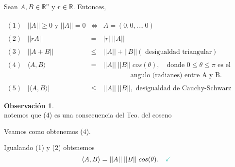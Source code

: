 \documentclass{article}
\theoremstyle{definition}
\theoremstyle{definition}
\newtheorem*{obs}{Observación}
\theoremstyle{remark}
\newcommand\ok{\checkmark}
\begin{document}
\begin{teo}
  Sean $A,B \in \mathbb{R}^n$ y $r \in \mathbb{R}$. Entonces,\\\\ $\begin{array}{llcl}
    (1) & ||A|| \geq 0 \text{ y } ||A||=0 & \Leftrightarrow & A=(0,0,\dots,0) \\ \\
    (2) & ||rA|| & = &  |r|\; ||A|| \\\\
    (3) & ||A+B|| & \leq & ||A|| + ||B|| (\text{ desigualdad triangular}) \\\\
  (4) & \langle A,B \rangle & = & ||A||\; ||B|| \; cos(\theta), \quad  \text{donde } 0 \leq \theta \leq \pi \text{ es el}\\ & & & \quad \quad \quad \quad \text{angulo (radianes) entre A y B}.\\\\
  (5) & |\langle A,B \rangle| & \leq & ||A||\; ||B||,  \text{ desigualdad de Cauchy-Schwarz}
  \end{array}$
\end{teo}
\pagebreak 
\begin{obs} \; \\
  notemos que (4) es una consecuencia del Teo. del coseno 

\end{obs}

\begin{figure}[h]
\centering
\def\svgwidth{0.75\textwidth}

\end{figure}

Veamos como obtenemos (4).

\begin{figure}[h]
\centering
\def\svgwidth{1\textwidth}

\end{figure}

Igualando \textcolor{azulp2}{(1)} y \textcolor{azulp2}{(2)} obtenemos 
\[
  \langle A,B \rangle = ||A|| \; ||B|| \; cos(\theta). \quad \textcolor{verdep2}{\ok}
\] 
\end{document}
